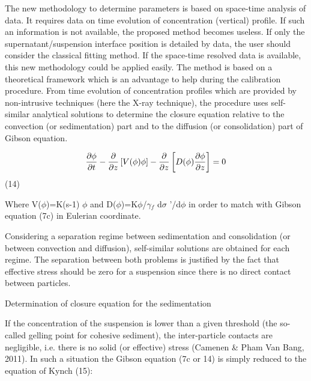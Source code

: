 The new methodology to determine parameters is based on space-time analysis
of data. It requires data on time evolution of concentration (vertical)
profile. If such an information is not available, the proposed method
becomes useless. If only the supernatant/suspension interface position is
detailed by data, the user should consider the classical fitting method.%
\newline
If the space-time resolved data is available, this new methodology could be
applied easily. The method is based on a theoretical framework which is an
advantage to help during the calibration procedure. From time evolution of
concentration profiles which are provided by non-intrusive techniques (here
the X-ray technique), the procedure uses self-similar analytical solutions
to determine the closure equation relative to the convection (or
sedimentation) part and to the diffusion (or consolidation) part of Gibson
equation.

\begin{equation*}
\dfrac{\partial \phi }{\partial t} -\dfrac{\partial }{\partial z} \left[
V(\phi )\phi \right] -\dfrac{\partial }{\partial z} \left[ D(\phi )\dfrac{%
\partial \phi }{\partial z} \right] =0 
\end{equation*}%
\hspace{5mm} \hspace{5mm} \hspace{5mm} \hspace{5mm} (14)

Where V($\phi$)=K(s-1) $\phi$ and D($\phi$)=K$\phi$/$\gamma$$_{f}$ d$\sigma$%
'/d$\phi$ in order to match with Gibson equation (7c) in Eulerian coordinate.

Considering a separation regime between sedimentation and consolidation (or
between convection and diffusion), self-similar solutions are obtained for
each regime. The separation between both problems is justified by the fact
that effective stress should be zero for a suspension since there is no
direct contact between particles.

Determination of closure equation for the sedimentation

If the concentration of the suspension is lower than a given threshold (the
so-called gelling point for cohesive sediment), the inter-particle contacts
are negligible, i.e. there is no solid (or effective) stress (Camenen \&
Pham Van Bang, 2011). In such a situation the Gibson equation (7c or 14) is
simply reduced to the equation of Kynch (15):

